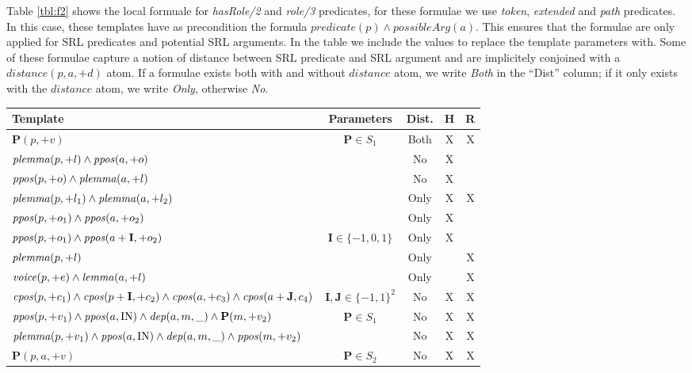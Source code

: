Table \ref{tbl:f2} shows the local formuale for \emph{hasRole/2} and 
\emph{role/3} predicates,  for these formulae we use \emph{token}, 
\emph{extended} and \emph{path} predicates. In this case, these templates have 
as precondition the formula $predicate(p) \land possibleArg(a)$. This ensures that
the formulae are only applied for SRL predicates and potential SRL arguments.  
In the table we include the values to replace the template parameters with. Some 
of these formulae capture a notion of distance between SRL predicate and SRL 
argument and are implicitely conjoined with a $distance(p,a,+d)$ atom. If a formulae exists
both with and without $distance$ atom, we write \emph{Both} in the ``Dist'' column; if it only exists
with the $distance$ atom, we write \emph{Only}, otherwise \emph{No}.
\begin{table*}[th]
\centering
\begin{tabular}{|>{\small}p{10cm}|>{\small}c|>{\small}c|>{\small}c|>{\small}c|}\hline
 Template               & Parameters & Dist. & H & R \\\hline
   $ \mathbf{P}(p,+v)         $    & $\mathbf{P} \in S_1$   & Both & X & X \\
   $ \mathit{plemma} (p,+l) \land \mathit{ppos}(a,+o) $   & & No    & X &  \\
   $ \mathit{ppos}(p,+o)    \land \mathit{plemma}(a,+l)  $   & & No    & X &  \\
   $ \mathit{plemma}(p,+l_1) \land \mathit{plemma}(a,+l_2)$   & & Only  & X & X \\
   $ \mathit{ppos}(p,+o_1) \land \mathit{ppos}(a,+o_2)$       & & Only  & X &   \\
   $ \mathit{ppos}(p,+o_1) \land \mathit{ppos}(a+\mathbf{I},+o_2)$     & $\mathbf{I} \in 
   \{-1,0,1\}$ & Only& X &   \\
   $ \mathit{plemma}(p,+l)$ & & Only & & X  \\
   $ \mathit{voice}(p,+e) \land \mathit{lemma}(a,+l)$ & & Only & & X  \\
   $ \mathit{cpos}(p,+c_1) \land \mathit{cpos}(p+\mathbf{I},+c_2) \land \mathit{cpos}(a,+c_3) \land 
   \mathit{cpos}(a+\mathbf{J},c_4)$ & $\mathbf{I},\mathbf{J} \in \{-1,1\}^2$ & No & X & 
   X\\
   $ \mathit{ppos}(p,+v_1) \land \mathit{ppos}(a,\text{IN}) \land \mathit{dep}(a,m,\_) \land 
   \mathbf{P}(m,+v_2) $ & $\mathbf{P} \in S_1$ & No & X &  X \\
   $ \mathit{plemma}(p,+v_1) \land \mathit{ppos}(a,\text{IN}) \land \mathit{dep}(a,m,\_) \land 
   \mathit{ppos}(m,+v_2) $ & & No & X &  X \\
   $ \mathbf{P}(p,a,+v)         $    & $\mathbf{P} \in S_2$ & No & X & X \\

\end{tabular}
\end{table*}
